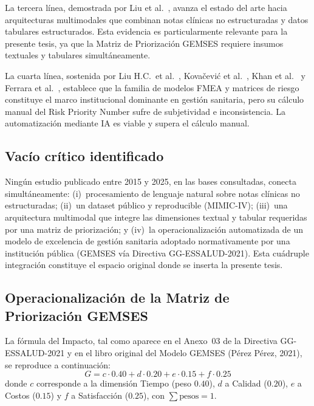 \documentclass[11pt,a4paper]{article}
\begin{document}
La tercera línea, demostrada por Liu et al.~\cite{liux2024}, avanza el estado del arte hacia arquitecturas multimodales que combinan notas clínicas no estructuradas y datos tabulares estructurados. Esta evidencia es particularmente relevante para la presente tesis, ya que la Matriz de Priorización GEMSES requiere insumos textuales y tabulares simultáneamente.

La cuarta línea, sostenida por Liu H.C.~et al.~\cite{liuhc2023}, Kovačević et al.~\cite{kovacevic2024}, Khan et al.~\cite{khan2025} y Ferrara et al.~\cite{ferrara2024}, establece que la familia de modelos FMEA y matrices de riesgo constituye el marco institucional dominante en gestión sanitaria, pero su cálculo manual del Risk Priority Number sufre de subjetividad e inconsistencia. La automatización mediante IA es viable y supera el cálculo manual.

\subsection{Vacío crítico identificado}

Ningún estudio publicado entre 2015 y 2025, en las bases consultadas, conecta simultáneamente: (i)~procesamiento de lenguaje natural sobre notas clínicas no estructuradas; (ii)~un dataset público y reproducible (MIMIC-IV); (iii)~una arquitectura multimodal que integre las dimensiones textual y tabular requeridas por una matriz de priorización; y (iv)~la operacionalización automatizada de un modelo de excelencia de gestión sanitaria adoptado normativamente por una institución pública (GEMSES vía Directiva GG-ESSALUD-2021). Esta cuádruple integración constituye el espacio original donde se inserta la presente tesis.

\subsection{Operacionalización de la Matriz de Priorización GEMSES}

La fórmula del Impacto, tal como aparece en el Anexo~03 de la Directiva GG-ESSALUD-2021 y en el libro original del Modelo GEMSES (Pérez Pérez, 2021), se reproduce a continuación:
\begin{equation}
G = c \cdot 0.40 + d \cdot 0.20 + e \cdot 0.15 + f \cdot 0.25
\end{equation}
donde $c$ corresponde a la dimensión Tiempo (peso $0.40$), $d$ a Calidad ($0.20$), $e$ a Costos ($0.15$) y $f$ a Satisfacción ($0.25$), con $\sum \text{pesos} = 1$.
\end{document}
